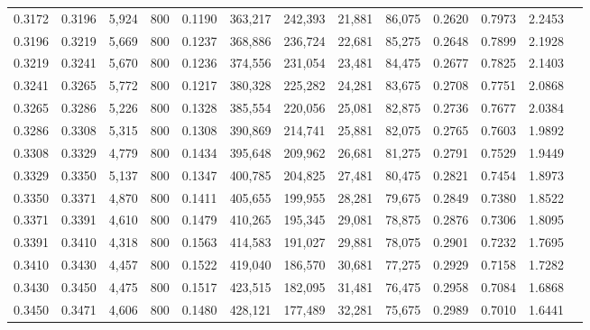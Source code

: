 \begin{tabular}{rrrrrrrrrrrrr}
0.3172 & 0.3196 &  5,924 &   800 &                                     0.1190 & 363,217 & 242,393 &  21,881 &  86,075 & 0.2620 & 0.7973 & 2.2453 \\
0.3196 & 0.3219 &  5,669 &   800 &                                     0.1237 & 368,886 & 236,724 &  22,681 &  85,275 & 0.2648 & 0.7899 & 2.1928 \\
0.3219 & 0.3241 &  5,670 &   800 &                                     0.1236 & 374,556 & 231,054 &  23,481 &  84,475 & 0.2677 & 0.7825 & 2.1403 \\
0.3241 & 0.3265 &  5,772 &   800 &                                     0.1217 & 380,328 & 225,282 &  24,281 &  83,675 & 0.2708 & 0.7751 & 2.0868 \\
0.3265 & 0.3286 &  5,226 &   800 &                                     0.1328 & 385,554 & 220,056 &  25,081 &  82,875 & 0.2736 & 0.7677 & 2.0384 \\
0.3286 & 0.3308 &  5,315 &   800 &                                     0.1308 & 390,869 & 214,741 &  25,881 &  82,075 & 0.2765 & 0.7603 & 1.9892 \\
0.3308 & 0.3329 &  4,779 &   800 &                                     0.1434 & 395,648 & 209,962 &  26,681 &  81,275 & 0.2791 & 0.7529 & 1.9449 \\
0.3329 & 0.3350 &  5,137 &   800 &                                     0.1347 & 400,785 & 204,825 &  27,481 &  80,475 & 0.2821 & 0.7454 & 1.8973 \\
0.3350 & 0.3371 &  4,870 &   800 &                                     0.1411 & 405,655 & 199,955 &  28,281 &  79,675 & 0.2849 & 0.7380 & 1.8522 \\
0.3371 & 0.3391 &  4,610 &   800 &                                     0.1479 & 410,265 & 195,345 &  29,081 &  78,875 & 0.2876 & 0.7306 & 1.8095 \\
0.3391 & 0.3410 &  4,318 &   800 &                                     0.1563 & 414,583 & 191,027 &  29,881 &  78,075 & 0.2901 & 0.7232 & 1.7695 \\
0.3410 & 0.3430 &  4,457 &   800 &                                     0.1522 & 419,040 & 186,570 &  30,681 &  77,275 & 0.2929 & 0.7158 & 1.7282 \\
0.3430 & 0.3450 &  4,475 &   800 &                                     0.1517 & 423,515 & 182,095 &  31,481 &  76,475 & 0.2958 & 0.7084 & 1.6868 \\
0.3450 & 0.3471 &  4,606 &   800 &                                     0.1480 & 428,121 & 177,489 &  32,281 &  75,675 & 0.2989 & 0.7010 & 1.6441 \\

\end{tabular}
